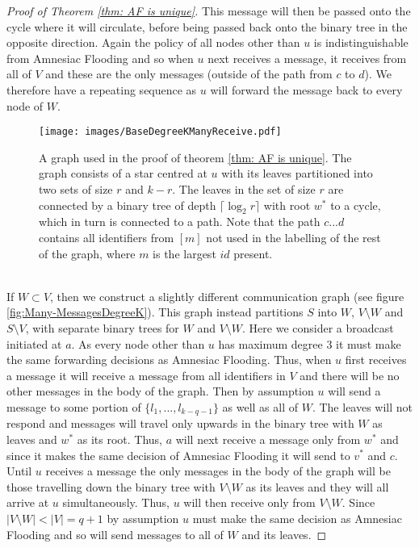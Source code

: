 \begin{proof}[Proof of Theorem \ref{thm: AF is unique}]
    This message will then be passed onto the cycle where it will circulate, before being passed back onto the binary tree in the opposite direction. 
    Again the policy of all nodes other than $u$ is indistinguishable from Amnesiac Flooding and so when $u$ next receives a message, it receives from all of $V$ and these are the only messages (outside of the path from $c$ to $d$).
    We therefore have a repeating sequence as $u$ will forward the message back to every node of $W$.
    \begin{figure}
        \centering
        \texttt{[image: images/BaseDegreeKManyReceive.pdf]}
        \caption{A graph used in the proof of theorem \ref{thm: AF is unique}. The graph consists of a star centred at $u$ with its leaves partitioned into two sets of size $r$ and $k-r$. The leaves in the set of size $r$ are connected by a binary tree of depth $\lceil \log_2{r}\rceil$ with root $w^*$ to a cycle, which in turn is connected to a path. Note that the path $c...d$ contains all identifiers from $[m]$ not used in the labelling of the rest of the graph, where $m$ is the largest $id$ present.}
        \label{fig: BaseMany-MessagesDegreeK}
    \end{figure}\\
        If $W\subset V$, then we construct a slightly different communication graph (see figure \ref{fig:Many-MessagesDegreeK}).
    This graph instead partitions $S$ into $W$, $V \setminus W$ and $S \setminus V$, with separate binary trees for $W$ and $V \setminus W$.
    Here we consider a broadcast initiated at $a$.
    As every node other than $u$ has maximum degree $3$ it must make the same forwarding decisions as Amnesiac Flooding. 
    Thus, when $u$ first receives a message it will receive a message from all identifiers in $V$ and there will be no other messages in the body of the graph.
    Then by assumption $u$ will send a message to some portion of $\{l_1,...,l_{k-q-1}\}$ as well as all of $W$. 
    The leaves will not respond and messages will travel only upwards in the binary tree with $W$ as leaves and $w^*$ as its root. 
    Thus, $a$ will next receive a message only from $w^*$ and since it makes the same decision of Amnesiac Flooding it will send to $v^*$ and $c$. 
    Until $u$ receives a message the only messages in the body of the graph will be those travelling down the binary tree with $V\setminus W$ as its leaves and they will all arrive at $u$ simultaneously. 
    Thus, $u$ will then receive only from $V\setminus W$. Since $|V\setminus W|<|V|=q+1$ by assumption $u$ must make the same decision as Amnesiac Flooding and so will send messages to all of $W$ and its leaves. 

\end{proof}

